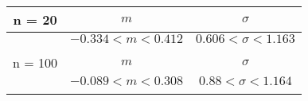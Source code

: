 \begin{tabular}{| c | c | c |} \\ \hline 
n = 20 & $m$ & $\sigma$ \\ \hline 
 & $-0.334 < m < 0.412$ & $0.606 < \sigma < 1.163$ \\ \hline 
 & & \\ \hline 
n = 100 & $m$ & $\sigma$ \\ \hline 
 & $-0.089 < m < 0.308$ & $0.88 < \sigma < 1.164$ \\ \hline 
 & & \\ \hline 
 \end{tabular} 
